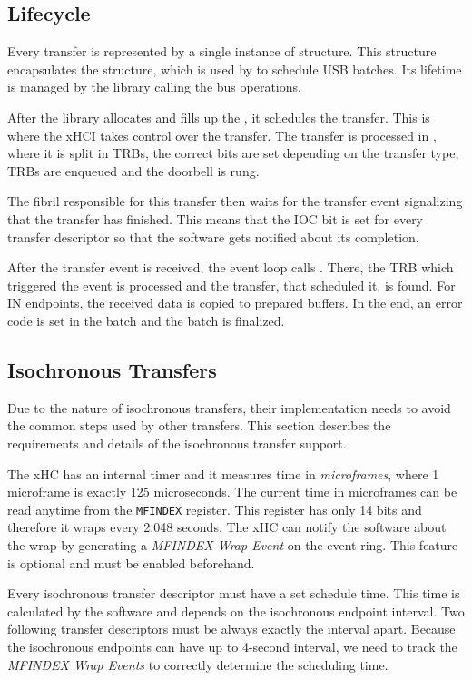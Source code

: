 \subsection{Lifecycle}

Every transfer is represented by a single instance of 
structure. This structure encapsulates the 
structure, which is used by  to schedule USB batches. Its
lifetime is managed by the library calling the bus operations.

After the library allocates and fills up the , it
schedules the transfer. This is where the xHCI takes control over the transfer.
The transfer is processed in , where it is split
in TRBs, the correct bits are set depending on the transfer type, TRBs are
enqueued and the doorbell is rung.

The fibril responsible for this transfer then waits for the transfer event
signalizing that the transfer has finished. This means that the IOC bit is set
for every transfer descriptor so that the software gets notified about its
completion.

After the transfer event is received, the event loop calls
. There, the TRB which triggered the event is
processed and the transfer, that scheduled it, is found. For IN endpoints, the
received data is copied to prepared buffers. In the end, an error code is set in
the batch and the batch is finalized.

\subsection{Isochronous Transfers}

Due to the nature of isochronous transfers, their implementation needs to avoid
the common steps used by other transfers. This section describes the
requirements and details of the isochronous transfer support.

The xHC has an internal timer and it measures time in \textit{microframes},
where 1 microframe is exactly 125 microseconds. The current time in microframes
can be read anytime from the \texttt{MFINDEX} register. This register has only
14 bits and therefore it wraps every 2.048 seconds. The xHC can notify the
software about the wrap by generating a \textit{MFINDEX Wrap Event} on the
event ring. This feature is optional and must be enabled beforehand.

Every isochronous transfer descriptor must have a set schedule time. This time
is calculated by the software and depends on the isochronous endpoint interval.
Two following transfer descriptors must be always exactly the interval apart.
Because the isochronous endpoints can have up to 4-second interval, we need to
track the \textit{MFINDEX Wrap Events} to correctly determine the scheduling
time.

